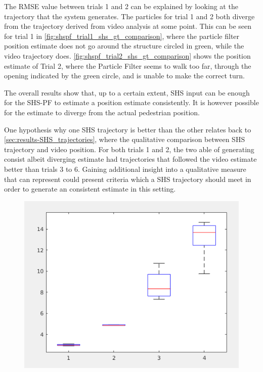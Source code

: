 The RMSE value between trials 1 and 2 can be explained by looking at the trajectory that the system generates. The particles for trial 1 and 2 both diverge from the trajectory derived from video analysis at some point. This can be seen for trial 1 in  \cref{fig:shspf_trial1_shs_gt_comparison}, where the particle filter position estimate does not go around the structure circled in green, while the video trajectory does. \cref{fig:shspf_trial2_shs_gt_comparison} shows the position estimate of Trial 2, where the Particle Filter seems to walk too far, through the opening indicated by the green circle,  and is unable to make the correct turn. \par 

The overall results show that, up to a certain extent, SHS input can be enough for the SHS-PF to estimate a position estimate consistently. It is however possible for the estimate to diverge from the actual pedestrian position.

One hypothesis why one SHS trajectory is better than the other relates back to \cref{sec:results-SHS_trajectories}, where the qualitative comparison between SHS trajectory and video position. For both trials 1 and 2, the two able of generating consist albeit diverging estimate had trajectories that followed the video estimate better than trials 3 to 6. Gaining additional insight into a qualitative measure that can represent could present criteria which a SHS trajectory should meet in order to generate an consistent estimate in this setting. 

\begin{figure}[H]
	\centering
	\includegraphics[width=0.7\linewidth]{images/placeholder}
	\caption{}
	\label{fig:placeholder}
\end{figure}



